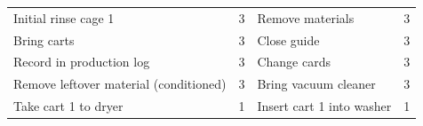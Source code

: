 \begin{table}[htbp]
\begin{tabularx}{\textwidth}{l c l c}
Initial rinse cage 1 & 3 & Remove materials & 3 \\

Bring carts & 3 & Close guide & 3 \\

Record in production log & 3 & Change cards & 3 \\

Remove leftover material (conditioned) & 3 & Bring vacuum cleaner & 3 \\

Take cart 1 to dryer & 1 & Insert cart 1 into washer & 1 \\

\midrule

\end{tabularx}

\end{table}
